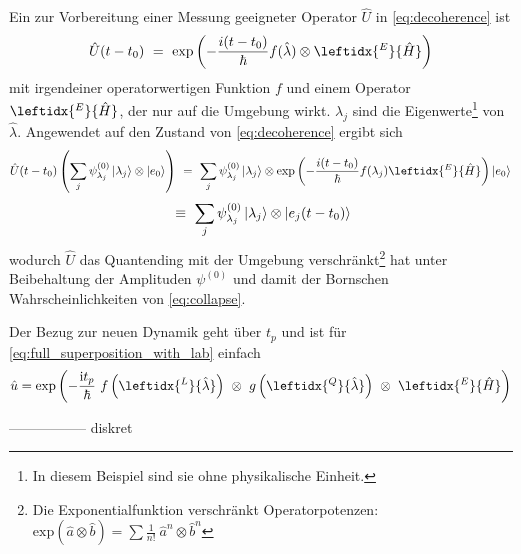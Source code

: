 \documentclass[12pt]{article}
\begin{document}
Ein zur Vorbereitung einer Messung geeigneter Operator $\hat{U}$ in \eqref{eq:decoherence} ist
\begin{equation*}
\hat{U}(t-t_0)\ =\ \mathrm{exp}\left(-\frac{i(t-t_0)}{\hbar}f(\hat{\lambda})\otimes \leftidx{^E}{\hat{H}}\right)
\end{equation*}
mit irgendeiner operatorwertigen Funktion $f$ und einem Operator $\leftidx{^E}{\hat{H}}$, der nur auf die Umgebung wirkt. $\lambda_j$ sind die Eigenwerte\footnote{In diesem Beispiel sind sie ohne physikalische Einheit.} von $\hat{\lambda}$.
Angewendet auf den Zustand von \eqref{eq:decoherence} ergibt sich
\begin{equation*}
\hat{U}(t-t_0)\left(\sum_j \psi^{(0)}_{\lambda_j} \ket{\lambda_j}\otimes\ket{e_0}\right)
\ =\ \sum_j \psi^{(0)}_{\lambda_j} \ket{\lambda_j} 
\otimes \mathrm{exp}\left(-\frac{i(t-t_0)}{\hbar}f(\lambda_j)\leftidx{^E}{\hat{H}}\right)
\ket{e_0} 
\end{equation*}
\begin{equation*}
\ \equiv\ 
\sum_j \psi^{(0)}_{\lambda_j} \ket{\lambda_j} 
\otimes \ket{e_j(t-t_0)} 
\end{equation*}
wodurch $\hat{U}$ das Quantending mit der Umgebung verschränkt\footnote{Die Exponentialfunktion verschränkt Operatorpotenzen: $\mathrm{exp}(\hat{a}\otimes\hat{b})=\sum \frac{1}{n\mathrm{!}}\ \hat{a}^n\otimes\hat{b}^n$} hat unter Beibehaltung der Amplituden $\psi^{(0)}$ und damit der Bornschen Wahrscheinlichkeiten von \eqref{eq:collapse}.

Der Bezug zur neuen Dynamik geht über $t_p$ und ist für \eqref{eq:full_superposition_with_lab} einfach
\begin{equation*}
\hat{u} = \mathrm{exp}\left(
-\frac{\mathrm{i}t_p}{\hbar}\ f\left(\leftidx{^L}{\hat{\lambda}}\right)\ \otimes\  g\left(\leftidx{^Q}{\hat{\lambda}}\right)\ \otimes\ \leftidx{^E}{\hat{H}}
\right)
\end{equation*}

-----------------
diskret
\end{document}
